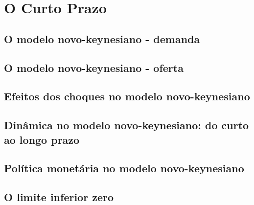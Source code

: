 \documentclass[a4paper,11pt]{book}
\theoremstyle{definition}
\begin{document}
\part{O Curto Prazo}

\chapter{O modelo novo-keynesiano - demanda}

\chapter{O modelo novo-keynesiano - oferta}

\chapter{Efeitos dos choques no modelo novo-keynesiano}

\chapter{Dinâmica no modelo novo-keynesiano: do curto ao longo prazo}

\chapter{Política monetária no modelo novo-keynesiano}

\chapter{O limite inferior zero}
\end{document}
